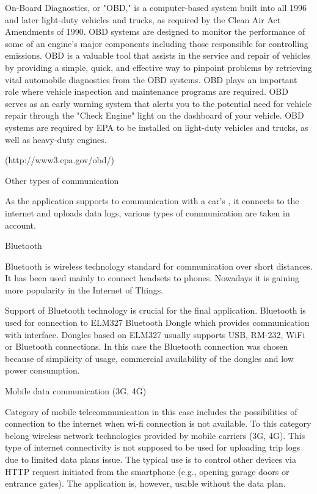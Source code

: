 On-Board Diagnostics, or "OBD," is a computer-based system built into all 1996 and later light-duty vehicles and trucks, as required by the Clean Air Act Amendments of 1990. OBD systems are designed to monitor the performance of some of an engine's major components including those responsible for controlling emissions. 
OBD is a valuable tool that assists in the service and repair of vehicles by providing a simple, quick, and effective way to pinpoint problems by retrieving vital automobile diagnostics from the OBD systems.
OBD plays an important role where vehicle inspection and maintenance programs are required.
OBD serves as an early warning system that alerts you to the potential need for vehicle repair through the "Check Engine" light on the dashboard of your vehicle.
OBD systems are required by EPA to be installed on light-duty vehicles and trucks, as well as heavy-duty engines.

(http://www3.epa.gov/obd/)

\secc Other types of communication

As the application supports to communication with a car's , it connects to the internet and uploads data logs, various types of communication are taken in account.

\seccc Bluetooth

Bluetooth is wireless technology standard for communication over short distances. It has been used mainly to connect headsets to phones. Nowadays it is gaining more popularity in the Internet of Things.

Support of Bluetooth technology is crucial for the final application. Bluetooth is used for connection to ELM327 Bluetooth Dongle which provides communication with  interface. Dongles based on ELM327 usually supports USB, RM-232, WiFi or Bluetooth connections. In this case the Bluetooth connection was chosen because of simplicity of usage, commercial availability of the dongles and low power consumption.

\seccc Mobile data communication (3G, 4G)

Category of mobile telecommunication in this case includes the possibilities of connection to the internet when wi-fi connection is not available. To this category belong wireless network technologies provided by mobile carriers (3G, 4G). This type of internet connectivity is not supposed to be used for uploading trip logs due to limited data plans issue. The typical use is to control other devices via HTTP request initiated from the smartphone (e.g., opening garage doors or entrance gates). The application is, however, usable without the data plan.

